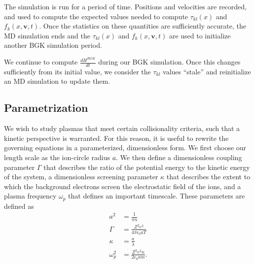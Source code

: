 \documentclass{article}
\begin{document}
The simulation is run for a period of time. Positions and velocities are recorded, and used to compute the expected values needed to compute $\tau_{kl}(x)$ and $f_k(x,\mathbf{v},t)$. Once the statistics on these quantities are sufficiently accurate, the MD simulation ends and the $\tau_{kl}(x)$ and $f_k(x,\mathbf{v},t)$ are used to initialize another BGK simulation period.

We continue to compute $\frac{d H^{BGK}}{dt}$ during our BGK simulation. Once this changes sufficiently from its initial value, we consider the $\tau_{kl}$ values ``stale'' and reinitialize an MD simulation to update them.

\subsection{Parametrization}

We wish to study plasmas that meet certain collisionality criteria, such that a kinetic perspective is warranted. For this reason, it is useful to rewrite the governing equations in a parameterized, dimensionless form. We first choose our length scale as the ion-circle radius $a$. We then define a dimensionless coupling parameter $\Gamma$ that describes the ratio of the potential energy to the kinetic energy of the system, a dimensionless screening parameter $\kappa$ that describes the extent to which the background electrons screen the electrostatic field of the ions, and a plasma frequency $\omega_p$ that defines an important timescale. These parameters are defined as
\begin{align}
a^2 &= \frac{1}{\pi n} \\
\Gamma &= \frac{Z^2e^2}{4\pi\epsilon_0aT} \\
\kappa &= \frac{a}{\lambda}\\
\omega_p^2 &= \frac{Z^2e^2n}{2\epsilon_0am}.
\end{align}
\end{document}
